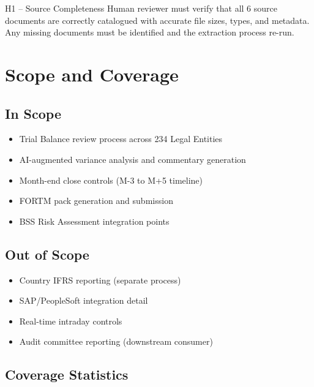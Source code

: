 \begin{hitlbox}{H1 -- Source Completeness}
Human reviewer must verify that all 6 source documents are correctly
catalogued with accurate file sizes, types, and metadata. Any missing
documents must be identified and the extraction process re-run.
\end{hitlbox}

\section{Scope and Coverage}
\label{sec:scope-coverage}

\subsection{In Scope}

\begin{itemize}[noitemsep]
  \item Trial Balance review process across 234 Legal Entities
  \item AI-augmented variance analysis and commentary generation
  \item Month-end close controls (M-3 to M+5 timeline)
  \item FORTM pack generation and submission
  \item BSS Risk Assessment integration points
\end{itemize}

\subsection{Out of Scope}

\begin{itemize}[noitemsep]
  \item Country IFRS reporting (separate process)
  \item SAP/PeopleSoft integration detail
  \item Real-time intraday controls
  \item Audit committee reporting (downstream consumer)
\end{itemize}

\subsection{Coverage Statistics}

